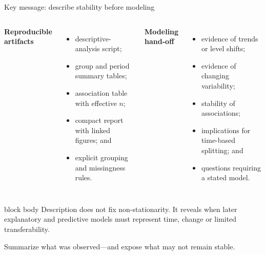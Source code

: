 \documentclass[10pt,aspectratio=169]{beamer}
\begin{document}
\begin{frame}{Key message: describe stability before modeling}

\small

\begin{columns}[T]


\textbf{Reproducible artifacts}

\begin{itemize}
  \item descriptive-analysis script;
  \item group and period summary tables;
  \item association table with effective $n$;
  \item compact report with linked figures; and
  \item explicit grouping and missingness rules.
\end{itemize}


\textbf{Modeling hand-off}

\begin{itemize}
  \item evidence of trends or level shifts;
  \item evidence of changing variability;
  \item stability of associations;
  \item implications for time-based splitting; and
  \item questions requiring a stated model.
\end{itemize}

\end{columns}

\vspace{0.30cm}

\begin{beamercolorbox}[rounded=true,sep=8pt]{block body}
Description does not fix non-stationarity. It reveals when later explanatory and predictive models must represent time, change or limited transferability.
\end{beamercolorbox}

\vspace{0.15cm}

\centering
\textcolor{ukudlaRed}{Summarize what was observed---and expose what may not remain stable.}

\end{frame}
\end{document}
